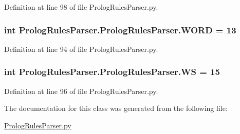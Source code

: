 Definition at line 98 of file Prolog\+Rules\+Parser.\+py.

\hypertarget{class_prolog_rules_parser_1_1_prolog_rules_parser_a2affda7f9e85561dd655e83074daae42}{}
\subsubsection[{W\+O\+R\+D}]{\setlength{\rightskip}{0pt plus 5cm}int Prolog\+Rules\+Parser.\+Prolog\+Rules\+Parser.\+W\+O\+R\+D = 13\hspace{0.3cm}{\ttfamily [static]}}\label{class_prolog_rules_parser_1_1_prolog_rules_parser_a2affda7f9e85561dd655e83074daae42}


Definition at line 94 of file Prolog\+Rules\+Parser.\+py.

\hypertarget{class_prolog_rules_parser_1_1_prolog_rules_parser_a1c98b9ac6d6a175c852cce914ad6d7ad}{}
\subsubsection[{W\+S}]{\setlength{\rightskip}{0pt plus 5cm}int Prolog\+Rules\+Parser.\+Prolog\+Rules\+Parser.\+W\+S = 15\hspace{0.3cm}{\ttfamily [static]}}\label{class_prolog_rules_parser_1_1_prolog_rules_parser_a1c98b9ac6d6a175c852cce914ad6d7ad}


Definition at line 96 of file Prolog\+Rules\+Parser.\+py.



The documentation for this class was generated from the following file\+:\begin{DoxyCompactItemize}
\item 
\hyperlink{_prolog_rules_parser_8py}{Prolog\+Rules\+Parser.\+py}\end{DoxyCompactItemize}
